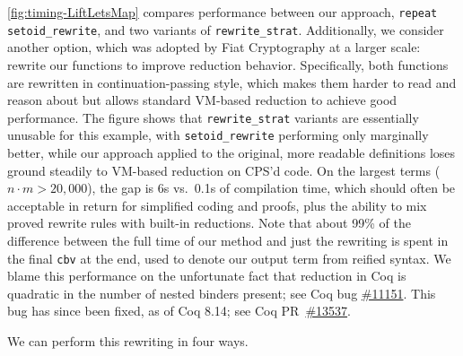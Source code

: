 \documentclass[a4paper,USenglish,cleveref,autoref,thm-restate]{lipics-v2021}
\newcommand{\coqbug}[1]{\href{https://github.com/coq/coq/issues/#1}{\##1}}
\newcommand{\coqpr}[1]{\href{https://github.com/coq/coq/pull/#1}{\##1}}
\newcommand{\taccbv}{\texttt{cbv}}
\begin{document}
\autoref{fig:timing-LiftLetsMap} compares performance between our approach, \texttt{repeat setoid\_rewrite}, and two variants of \texttt{rewrite\_strat}.
Additionally, we consider another option, which was adopted by Fiat Cryptography at a larger scale: rewrite our functions to improve reduction behavior.
Specifically, both functions are rewritten in continuation-passing style, which makes them harder to read and reason about but allows standard VM-based reduction to achieve good performance.
The figure shows that \texttt{rewrite\_strat} variants are essentially unusable for this example, with \texttt{setoid\_rewrite} performing only marginally better, while our approach applied to the original, more readable definitions loses ground steadily to VM-based reduction on CPS'd code.
On the largest terms ($n \cdot m > 20,000$), the gap is 6s vs.\ 0.1s of compilation time, which should often be acceptable in return for simplified coding and proofs, plus the ability to mix proved rewrite rules with built-in reductions.
Note that about 99\% of the difference between the full time of our method and just the rewriting is spent in the final \taccbv{} at the end, used to denote our output term from reified syntax.
We blame this performance on the unfortunate fact that reduction in Coq is quadratic in the number of nested binders present; see Coq bug \coqbug{11151}.
This bug has since been fixed, as of Coq 8.14; see Coq PR~\coqpr{13537}.

We can perform this rewriting in four ways.
\end{document}
